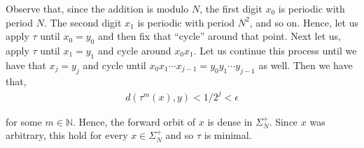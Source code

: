 \documentclass[12pt]{article}
\begin{document}
Observe that, since the addition is modulo $N$, the first digit $x_0$ is periodic with period $N$. The second digit $x_1$ is periodic with period $N^2$, and so on. Hence, let us apply $\tau$ until $x_0 = y_0$ and then fix that ``cycle'' around that point. Next let us, apply $\tau$ until $x_1 = y_1$ and cycle around $x_0x_1$. Let us continue this process until we have that $x_j = y_j$ and cycle until $x_0x_1\cdots x_{j-1} = y_0y_1 \cdots y_{j-1}$ as well. Then we have that,
\begin{align*}
d(\tau^m(x), y) < 1/2^j < \epsilon
\end{align*}

for some $m \in \mathbb{N}$. Hence, the forward orbit of $x$ is dense in $\Sigma_N^+$. Since $x$ was arbitrary, this hold for every $x \in \Sigma_N^+$ and so $\tau$ is minimal.
\end{document}
